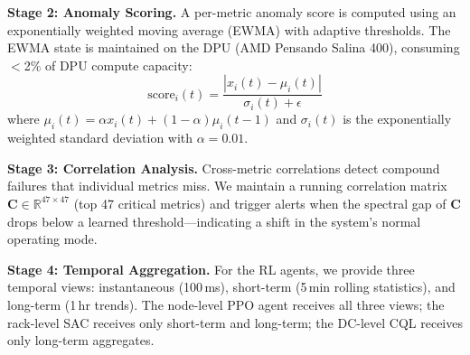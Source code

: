 \documentclass[conference,10pt,letterpaper]{IEEEtran}
\begin{document}
\textbf{Stage 2: Anomaly Scoring.} A per-metric anomaly score is computed using an exponentially weighted moving average (EWMA) with adaptive thresholds. The EWMA state is maintained on the DPU (AMD Pensando Salina 400), consuming $<$2\% of DPU compute capacity:
\begin{equation}
\text{score}_i(t) = \frac{|x_i(t) - \mu_i(t)|}{\sigma_i(t) + \epsilon}
\end{equation}
where $\mu_i(t) = \alpha x_i(t) + (1-\alpha)\mu_i(t-1)$ and $\sigma_i(t)$ is the exponentially weighted standard deviation with $\alpha = 0.01$.

\textbf{Stage 3: Correlation Analysis.} Cross-metric correlations detect compound failures that individual metrics miss. We maintain a running correlation matrix $\mathbf{C} \in \mathbb{R}^{47 \times 47}$ (top 47 critical metrics) and trigger alerts when the spectral gap of $\mathbf{C}$ drops below a learned threshold---indicating a shift in the system's normal operating mode.

\textbf{Stage 4: Temporal Aggregation.} For the RL agents, we provide three temporal views: instantaneous (100\,ms), short-term (5\,min rolling statistics), and long-term (1\,hr trends). The node-level PPO agent receives all three views; the rack-level SAC receives only short-term and long-term; the DC-level CQL receives only long-term aggregates.
\end{document}
